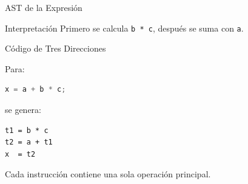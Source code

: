 \documentclass{beamer}
\begin{document}
\begin{frame}{AST de la Expresión}

\centering


\vspace{0.5cm}

\begin{block}{Interpretación}
Primero se calcula \texttt{b * c}, después se suma con \texttt{a}.
\end{block}

\end{frame}

\begin{frame}[fragile]{Código de Tres Direcciones}

Para:

\begin{lstlisting}[language=C]
x = a + b * c;
\end{lstlisting}

se genera:

\begin{lstlisting}
t1 = b * c
t2 = a + t1
x  = t2
\end{lstlisting}

\vspace{0.4cm}

Cada instrucción contiene una sola operación principal.

\end{frame}
\end{document}
